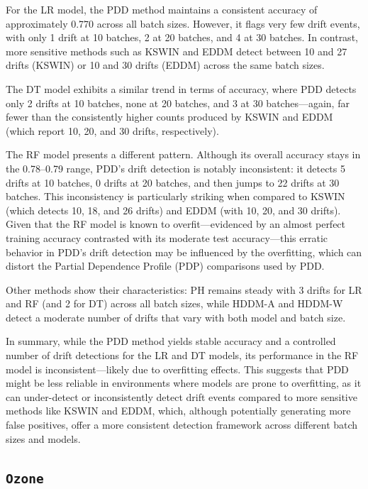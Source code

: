 \documentclass[pdflatex,sn-mathphys-ay]{sn-jnl}%
\theoremstyle{thmstyleone}%
\theoremstyle{thmstyletwo}%
\theoremstyle{thmstylethree}%
\begin{document}
For the LR model, the PDD method maintains a consistent accuracy of approximately 0.770 across all batch sizes. However, it flags very few drift events, with only 1 drift at 10 batches, 2 at 20 batches, and 4 at 30 batches. In contrast, more sensitive methods such as KSWIN and EDDM detect between 10 and 27 drifts (KSWIN) or 10 and 30 drifts (EDDM) across the same batch sizes.

The DT model exhibits a similar trend in terms of accuracy, where PDD detects only 2 drifts at 10 batches, none at 20 batches, and 3 at 30 batches—again, far fewer than the consistently higher counts produced by KSWIN and EDDM (which report 10, 20, and 30 drifts, respectively).

The RF model presents a different pattern. Although its overall accuracy stays in the 0.78–0.79 range, PDD's drift detection is notably inconsistent: it detects 5 drifts at 10 batches, 0 drifts at 20 batches, and then jumps to 22 drifts at 30 batches. This inconsistency is particularly striking when compared to KSWIN (which detects 10, 18, and 26 drifts) and EDDM (with 10, 20, and 30 drifts). Given that the RF model is known to overfit—evidenced by an almost perfect training accuracy contrasted with its moderate test accuracy—this erratic behavior in PDD’s drift detection may be influenced by the overfitting, which can distort the Partial Dependence Profile (PDP) comparisons used by PDD.

Other methods show their characteristics: PH remains steady with 3 drifts for LR and RF (and 2 for DT) across all batch sizes, while HDDM-A and HDDM-W detect a moderate number of drifts that vary with both model and batch size.

In summary, while the PDD method yields stable accuracy and a controlled number of drift detections for the LR and DT models, its performance in the RF model is inconsistent—likely due to overfitting effects. This suggests that PDD might be less reliable in environments where models are prone to overfitting, as it can under-detect or inconsistently detect drift events compared to more sensitive methods like KSWIN and EDDM, which, although potentially generating more false positives, offer a more consistent detection framework across different batch sizes and models.

\subsection*{\texttt{Ozone}}
\end{document}
